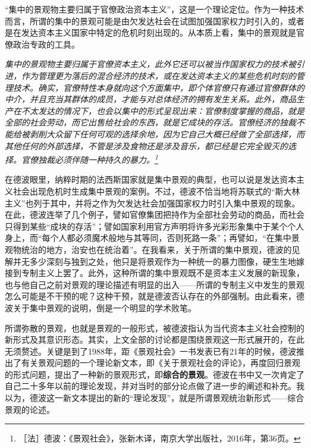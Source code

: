 \documentclass[fontset=fandol, a4paper, 12pt, openright]{ctexbook}
\renewenvironment{quote}
  {\list{}{\rightmargin\leftmargin}%
   \item\relax\small\itshape\color{darkgray}}
  {\endlist}
\begin{document}
“集中的景观物主要归属于官僚政治资本主义”，这是一个理论定位。作为一种技术而言，所谓的集中的景观可能是由欠发达社会在试图加强国家权力时引入的，或者是在发达资本主义国家中特定的危机时刻出现的。从本质上看，集中的景观就是官僚政治专政的工具。

\begin{quote}
集中的景观物主要归属于官僚资本主义，此外它还可以被当作国家权力的技术被引进，作为管理更为落后的混合经济的技术，或在发达资本主义的某些危机时刻的管理技术。确实，官僚特性本身就向这个方面集中，即个体官僚只有通过官僚群体的中介，并且充当其群体的成员，才能与对总体经济的拥有发生关系。此外，商品生产在不太发达的情况下，也会以集中的形式呈现出来：官僚制度掌握的商品，就是全部的社会劳动，而它出售给社会的东西，就是它成块的存活。官僚经济的独裁不能给被剥削大众留下任何可观的选择余地，因为它自己大概已经做了全部选择，而其他任何的外部选择，不管是涉及食物还是涉及音乐，都已经是它完全毁灭的选择。官僚独裁必须伴随一种持久的暴力。\footnote{［法］德波：《景观社会》，张新木译，南京大学出版社，2016年，第36页。}
\end{quote}

在德波眼里，纳粹时期的法西斯国家就是集中景观的典型，也可以说是发达资本主义社会出现危机时生成集中景观的案例。{\kaishu 不过，德波不恰当地将苏联式的“斯大林主义”也列于其中，并将之作为欠发达社会加强国家权力时引入集中景观的现象。}在此，德波连举了几个例子，譬如官僚集团把持作为全部社会劳动的商品，而社会只得到某些“成块的存活”；譬如国家利用官方声明将许多光彩形象集中于某个个人身上，而“每个人都必须魔术般地与其等同，否则死路一条”；再譬如，“在集中景观物统治的地方，治安也在统治着”。在我看来，关于所谓的集中景观，德波的见解并无多少深刻与独到之处，他只是将景观作为一种统一的暴力图像，硬生生地嫁接到专制主义上罢了。此外，这种所谓的集中景观既不是资本主义发展的新现象，也与他自己之前对景观的理论描述有明显的出入——所谓的专制主义中发生的景观怎么可能是不干预的呢？这种干预，就是德波否认存在的外部强制。由此看来，德波关于集中景观的说明，倒是一个明显的学术败笔。

所谓弥散的景观，也就是景观的一般形式，被德波指认为当代资本主义社会控制的新形式及其意识形态。其实，上文全部的讨论都是围绕景观这一形式展开的，在此无须赘述。关键是到了1988年，距《景观社会》一书发表已有21年的时候，德波推出了有关景观问题的一个理论新文本，即《关于景观社会的评论》，再度回归景观的形式问题，提出了一种新的景观形式，即\textbf{综合的景观}。德波在书中又一次肯定了自己二十多年以前的理论发现，并对当时的部分论点做了进一步的阐述和补充。我以为，德波这一新文本提出的新的“理论发现”，就是所谓景观统治新形式——综合景观的论述。
\end{document}
